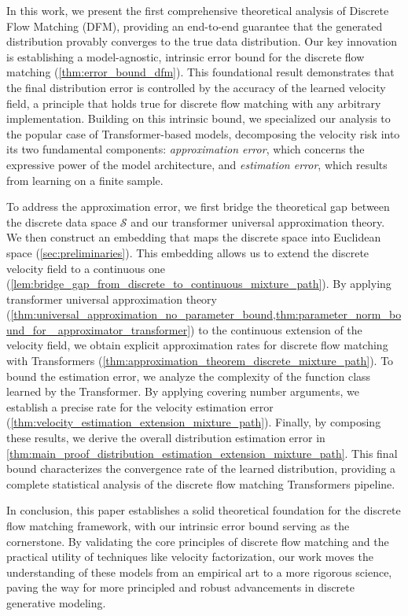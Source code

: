 \documentclass[12pt]{article}
\numberwithin{equation}{section}
\theoremstyle{theoremstyle}
\numberwithin{equation}{section}
\numberwithin{theorem}{section}
\numberwithin{proposition}{section}
\numberwithin{definition}{section}
\numberwithin{lemma}{section}
\numberwithin{assumption}{section}
\numberwithin{remark}{section}
\begin{document}
In this work, we present the first comprehensive theoretical analysis of Discrete Flow Matching (DFM), providing an end-to-end guarantee that the generated distribution provably converges to the true data distribution. 
Our key innovation is establishing a model-agnostic, intrinsic error bound for the discrete flow matching (\cref{thm:error_bound_dfm}). 
This foundational result demonstrates that the final distribution error is controlled by the accuracy of the learned velocity field, a principle that holds true for discrete flow matching with any arbitrary implementation. 
Building on this intrinsic bound, we specialized our analysis to the popular case of Transformer-based models, decomposing the velocity risk into its two fundamental components: \textit{approximation error}, which concerns the expressive power of the model architecture, and \textit{estimation error}, which results from learning on a finite sample.

To address the approximation error, we first bridge the theoretical gap between the discrete data space $\mathcal{S}$ and our transformer universal approximation theory.
We then construct an embedding that maps the discrete space into Euclidean space 
(\cref{sec:preliminaries}).
This embedding allows us to extend the discrete velocity field to a continuous one (\cref{lem:bridge_gap_from_discrete_to_continuous_mixture_path}).
By applying transformer universal approximation theory (\cref{thm:universal_approximation_no_parameter_bound,thm:parameter_norm_bound_for _approximator_transformer}) to the continuous extension of the velocity field, we obtain explicit approximation rates for discrete flow matching with Transformers (\cref{thm:approximation_theorem_discrete_mixture_path}).
To bound the estimation error, we analyze the complexity of the function class learned by the Transformer. By applying covering number arguments, we establish a precise rate for the velocity estimation error (\cref{thm:velocity_estimation_extension_mixture_path}).
Finally, by composing these results, we derive the overall distribution estimation error in \cref{thm:main_proof_distribution_estimation_extension_mixture_path}. This final bound characterizes the convergence rate of the learned distribution, providing a complete statistical analysis of the discrete flow matching Transformers pipeline.

In conclusion, this paper establishes a solid theoretical foundation for the discrete flow matching framework, with our intrinsic error bound serving as the cornerstone. 
By validating the core principles of discrete flow matching and the practical utility of techniques like velocity factorization, our work moves the understanding of these models from an empirical art to a more rigorous science, paving the way for more principled and robust advancements in discrete generative modeling.
\end{document}
